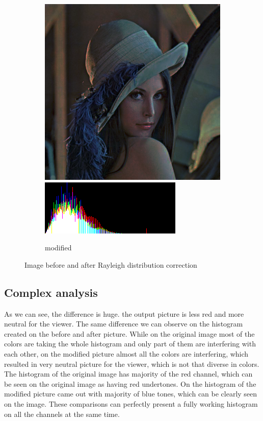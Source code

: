 \documentclass[12pt]{article}
\begin{document}
\begin{figure}[H]
\begin{subfigure}[t]{\subfiguresize}
        \includegraphics[width=\textwidth]{lena_hraleigh_1_200.png}\\[1ex]
        \includegraphics[width=\textwidth]{lena_hraleigh_1_200_histogram.png}
        \caption{modified}
    \end{subfigure}
    \caption{Image before and after Rayleigh distribution correction}
\end{figure}
\subsection{Complex analysis}

As we can see, the difference is huge. the output picture is less red and more neutral for the viewer.
The same difference we can observe on the histogram created on the before and after picture.
While on the original image most of the colors are taking the whole histogram and only part of them are interfering with each other,
on the modified picture almost all the colors are interfering, which resulted in very neutral picture for the viewer, which is not that diverse in colors.
The histogram of the original image has majority of the red channel, which can be seen on the original image as having red undertones.
On the histogram of the modified picture came out with majority of blue tones, which can be clearly seen on the image.
These comparisons can perfectly present a fully working histogram on all the channels at the same time.
\end{document}
